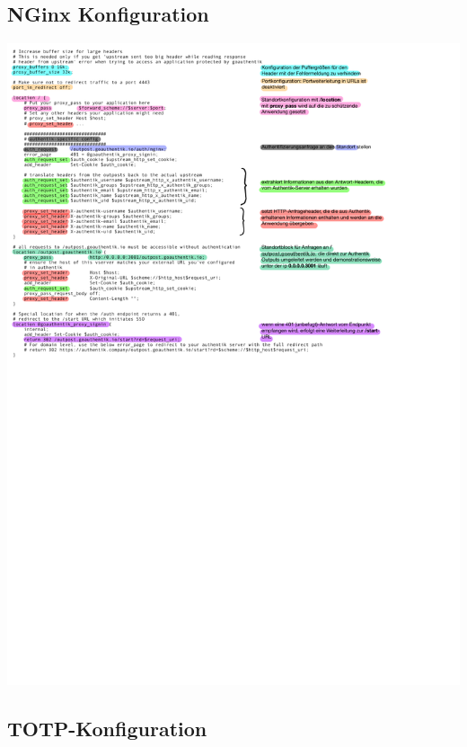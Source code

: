 \subsection{NGinx Konfiguration}
\label{app:CustomNGinxConfig}
\includegraphics{Anhang/Custom_NGinx_Configuration.pdf}

\subsection{TOTP-Konfiguration}
\label{sec:TOTPConfig}

